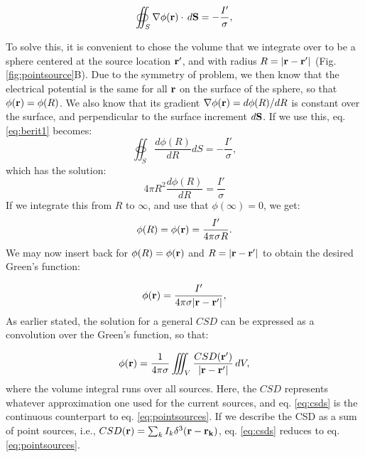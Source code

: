 \begin{equation}
\oiint_{S} \nabla\phi({\bf r}) \cdot \, d{\bf S}  = - \frac{I'}{\sigma},
\label{eq:berit1}
\end{equation}

To solve this, it is convenient to chose the volume that we integrate over to be a sphere centered at the source location ${\bf r'}$, and with radius $R = |{\bf r-r'}|$ (Fig. \ref{fig:pointsource}B). Due to the symmetry of problem, we then know that the electrical potential is the same for all ${\bf r}$ on the surface of the sphere, so that $\phi({\bf r}) = \phi(R)$. We also know that its gradient $\nabla\phi({\bf r}) = d\phi(R)/dR$ is constant over the surface, and perpendicular to the surface increment $d{\bf S}$. If we use this, eq. \ref{eq:berit1} becomes:
\begin{equation}
\oiint_{S} \frac{d\phi(R)}{dR} d{S}  = - \frac{I'}{\sigma},
\label{eq:berit1ogenhalv}
\end{equation}
which has the solution:
\begin{equation}
4\pi R^2 \frac{d\phi(R)}{dR} = \frac{I'}{\sigma}
\label{eq:berit2}
\end{equation}
If we integrate this from $R$ to $\infty$, and use that $\phi(\infty) = 0$, we get:
\begin{equation}
\phi(R) = \phi({\bf r}) = \frac{I'}{4\pi \sigma R}.
\label{eq:berit3}
\end{equation}
We may now insert back for $\phi(R)= \phi({\bf r})$ and $R = |{\bf r-r'}|$ to obtain the desired Green's function:

\begin{equation}
\phi({\bf r})= \frac{I'}{4\pi \sigma |{\bf r-r'}|},
\label{eq:berit4}
\end{equation}
As earlier stated, the solution for a general $CSD$ can be expressed as a convolution over the Green's function, so that:

\begin{equation}
\phi({\bf r}) = \frac{1}{4\pi \sigma}\iiint_V \frac{CSD({\bf r'})}{|{\bf r}-{\bf r'}|} \,dV, 
\label{eq:csds}
\end{equation}
where the volume integral runs over all sources. Here, the $CSD$ represents whatever approximation one used for the current sources, and eq. \ref{eq:csds} is the continuous counterpart to eq. \ref{eq:pointsources}. If we describe the CSD as a sum of point sources, i.e.,  $CSD({\bf r}) = \sum_k I_k \delta^3({\bf r} - {\bf r_k})$, eq. \ref{eq:csds} reduces to eq.\ref{eq:pointsources}.



